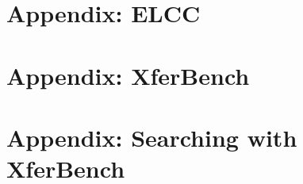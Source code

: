 


\appendix
{}

\chapter{Appendix: ELCC}


\chapter{Appendix: XferBench}


\chapter{Appendix: Searching with XferBench}



